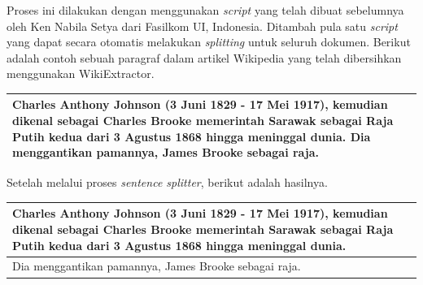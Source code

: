 Proses ini dilakukan dengan menggunakan \textit{script} yang telah dibuat sebelumnya oleh Ken Nabila Setya dari Fasilkom UI, Indonesia. Ditambah pula satu \textit{script} yang dapat secara otomatis melakukan \textit{splitting} untuk seluruh dokumen. Berikut adalah contoh sebuah paragraf dalam artikel Wikipedia yang telah dibersihkan menggunakan WikiExtractor.
\begin{center}
\begin{tabular}{ | m{32em} | } 
\hline
Charles Anthony Johnson (3 Juni 1829 - 17 Mei 1917), kemudian dikenal sebagai Charles Brooke memerintah Sarawak sebagai Raja Putih kedua dari 3 Agustus 1868 hingga meninggal dunia. Dia menggantikan pamannya, James Brooke sebagai raja. \\
\hline 
\end{tabular}
\end{center}

\noindent Setelah melalui proses \textit{sentence splitter}, berikut adalah hasilnya.
\begin{center}
\begin{tabular}{ | m{32em} | } 
\hline
Charles Anthony Johnson (3 Juni 1829 - 17 Mei 1917), kemudian dikenal sebagai Charles Brooke memerintah Sarawak sebagai Raja Putih kedua dari 3 Agustus 1868 hingga meninggal dunia. \\
\hline 
 Dia menggantikan pamannya, James Brooke sebagai raja. \\
\hline
\end{tabular}
\end{center}

